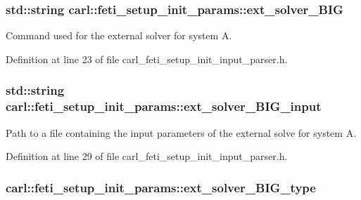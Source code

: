 \subsubsection[{ext\+\_\+solver\+\_\+\+B\+I\+G}]{\setlength{\rightskip}{0pt plus 5cm}std\+::string carl\+::feti\+\_\+setup\+\_\+init\+\_\+params\+::ext\+\_\+solver\+\_\+\+B\+I\+G}\label{structcarl_1_1feti__setup__init__params_a90db585fd2b345de1b58f60986785195}


Command used for the external solver for system A. 



Definition at line 23 of file carl\+\_\+feti\+\_\+setup\+\_\+init\+\_\+input\+\_\+parser.\+h.

\hypertarget{structcarl_1_1feti__setup__init__params_aea43484d9b7f2f6ab036842ea32a2507}{}
\subsubsection[{ext\+\_\+solver\+\_\+\+B\+I\+G\+\_\+input}]{\setlength{\rightskip}{0pt plus 5cm}std\+::string carl\+::feti\+\_\+setup\+\_\+init\+\_\+params\+::ext\+\_\+solver\+\_\+\+B\+I\+G\+\_\+input}\label{structcarl_1_1feti__setup__init__params_aea43484d9b7f2f6ab036842ea32a2507}


Path to a file containing the input parameters of the external solve for system A. 



Definition at line 29 of file carl\+\_\+feti\+\_\+setup\+\_\+init\+\_\+input\+\_\+parser.\+h.

\hypertarget{structcarl_1_1feti__setup__init__params_a60ddeeac9b3c334b3f4516dc347affec}{}
\subsubsection[{ext\+\_\+solver\+\_\+\+B\+I\+G\+\_\+type}]{ carl\+::feti\+\_\+setup\+\_\+init\+\_\+params\+::ext\+\_\+solver\+\_\+\+B\+I\+G\+\_\+type}\label{structcarl_1_1feti__setup__init__params_a60ddeeac9b3c334b3f4516dc347affec}


